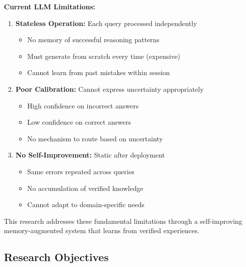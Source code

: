 \documentclass[12pt,a4paper]{article}
\theoremstyle{definition}
\begin{document}
\begin{problembox}
\textbf{Current LLM Limitations:}

\begin{enumerate}
    \item \textbf{Stateless Operation:} Each query processed independently
    \begin{itemize}
        \item No memory of successful reasoning patterns
        \item Must generate from scratch every time (expensive)
        \item Cannot learn from past mistakes within session
    \end{itemize}
    
    \item \textbf{Poor Calibration:} Cannot express uncertainty appropriately
    \begin{itemize}
        \item High confidence on incorrect answers
        \item Low confidence on correct answers
        \item No mechanism to route based on uncertainty
    \end{itemize}
    
    \item \textbf{No Self-Improvement:} Static after deployment
    \begin{itemize}
        \item Same errors repeated across queries
        \item No accumulation of verified knowledge
        \item Cannot adapt to domain-specific needs
    \end{itemize}
\end{enumerate}
\end{problembox}

This research addresses these fundamental limitations through a self-improving memory-augmented system that learns from verified experiences.

\subsection{Research Objectives}
\end{document}
